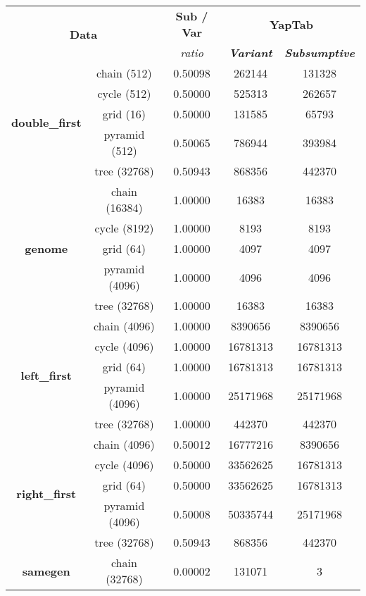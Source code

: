 \begin{table}[ht]
\centering
\footnotesize{
  \begin{tabular}{cc|c|cc}
   \hline
    \hline
    \multicolumn{2}{c|}{\multirow{2}{*}{\small{\textbf{Data}}}} & \textbf{\small{Sub / Var}} & \multicolumn{2}{c}{\small{\textbf{YapTab}}} \\
     \multicolumn{2}{c|}{} & \scriptsize{\textit{ratio}} & \textbf{\textit{\scriptsize{Variant}}} & \textbf{\textit{\scriptsize{Subsumptive}}} \\
   \hline
   \hline

\multirow{5}{*}{\textbf{double\_first}} &  chain (512) &  0.50098 &  262144 & 131328
\\
&  cycle (512) &  0.50000 &  525313 & 262657
\\
&  grid (16) &  0.50000 &  131585 & 65793
\\
&  pyramid (512) &  0.50065 &  786944 & 393984
\\
&  tree (32768) &  0.50943 &  868356 & 442370
\\
\hline
\multirow{5}{*}{\textbf{genome}} &  chain (16384) &  1.00000 &  16383 & 16383
\\
&  cycle (8192) &  1.00000 &  8193 & 8193
\\
&  grid (64) &  1.00000 &  4097 & 4097
\\
&  pyramid (4096) &  1.00000 &  4096 & 4096
\\
&  tree (32768) &  1.00000 &  16383 & 16383
\\
\hline
\multirow{5}{*}{\textbf{left\_first}} &  chain (4096) &  1.00000 &  8390656 & 8390656
\\
&  cycle (4096) &  1.00000 &  16781313 & 16781313
\\
&  grid (64) &  1.00000 &  16781313 & 16781313
\\
&  pyramid (4096) &  1.00000 &  25171968 & 25171968
\\
&  tree (32768) &  1.00000 &  442370 & 442370
\\
\hline
\multirow{5}{*}{\textbf{right\_first}} &  chain (4096) &  0.50012 &  16777216 & 8390656
\\
&  cycle (4096) &  0.50000 &  33562625 & 16781313
\\
&  grid (64) &  0.50000 &  33562625 & 16781313
\\
&  pyramid (4096) &  0.50008 &  50335744 & 25171968
\\
&  tree (32768) &  0.50943 &  868356 & 442370
\\
\hline
\multirow{5}{*}{\textbf{samegen}} &  chain (32768) &  0.00002 &  131071 & 3

\end{tabular}}
\end{table}

